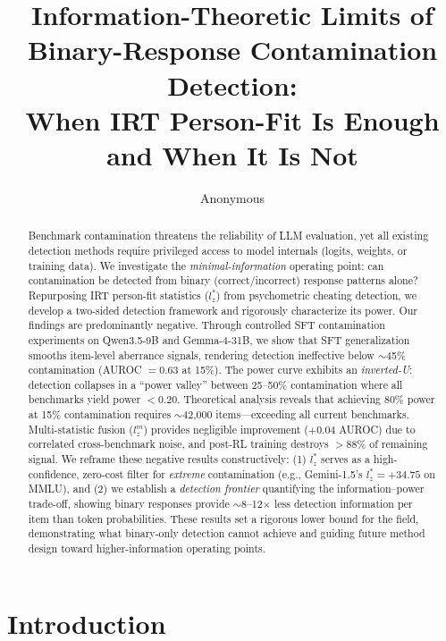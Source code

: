 \documentclass[11pt,a4paper]{article}
\title{Information-Theoretic Limits of Binary-Response Contamination Detection:\\When IRT Person-Fit Is Enough and When It Is Not}
\author{Anonymous}
\date{}
\newcommand{\lzstar}{$l_{z}^{*}$}
\newcommand{\lzm}{$l_{z}^{m}$}
\begin{document}
\maketitle

\begin{abstract}
Benchmark contamination threatens the reliability of LLM evaluation, yet all existing detection methods require privileged access to model internals (logits, weights, or training data). We investigate the \emph{minimal-information} operating point: can contamination be detected from binary (correct/incorrect) response patterns alone? Repurposing IRT person-fit statistics (\lzstar{}) from psychometric cheating detection, we develop a two-sided detection framework and rigorously characterize its power. Our findings are predominantly negative. Through controlled SFT contamination experiments on Qwen3.5-9B and Gemma-4-31B, we show that SFT generalization smooths item-level aberrance signals, rendering detection ineffective below $\sim$45\% contamination (AUROC $= 0.63$ at 15\%). The power curve exhibits an \emph{inverted-U}: detection collapses in a ``power valley'' between 25--50\% contamination where all benchmarks yield power $< 0.20$. Theoretical analysis reveals that achieving 80\% power at 15\% contamination requires $\sim$42{,}000 items---exceeding all current benchmarks. Multi-statistic fusion (\lzm{}) provides negligible improvement ($+$0.04 AUROC) due to correlated cross-benchmark noise, and post-RL training destroys $>$88\% of remaining signal. We reframe these negative results constructively: (1) \lzstar{} serves as a high-confidence, zero-cost filter for \emph{extreme} contamination (e.g., Gemini-1.5's $l_z^* = +34.75$ on MMLU), and (2) we establish a \emph{detection frontier} quantifying the information--power trade-off, showing binary responses provide $\sim$8--12$\times$ less detection information per item than token probabilities. These results set a rigorous lower bound for the field, demonstrating what binary-only detection cannot achieve and guiding future method design toward higher-information operating points.
\end{abstract}

\section{Introduction}
\end{document}
